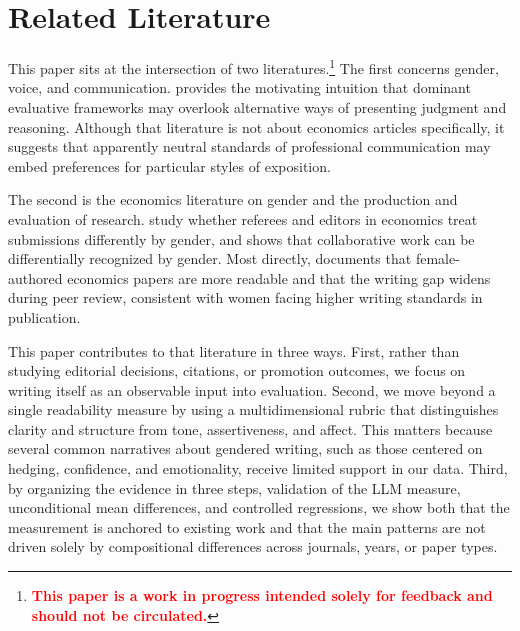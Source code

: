 \section{Related Literature}\label{sec:lit}

This paper sits at the intersection of two literatures.\footnote{\textcolor{red}{\textbf{This paper is a work in progress intended solely for feedback and should not be circulated.}}} The first concerns gender, voice, and communication. \textcite{gilligan1993different} provides the motivating intuition that dominant evaluative frameworks may overlook alternative ways of presenting judgment and reasoning. Although that literature is not about economics articles specifically, it suggests that apparently neutral standards of professional communication may embed preferences for particular styles of exposition.

The second is the economics literature on gender and the production and evaluation of research. \textcite{card2020} study whether referees and editors in economics treat submissions differently by gender, and \textcite{sarsons2017recognition} shows that collaborative work can be differentially recognized by gender. Most directly, \textcite{hengel2022publishing} documents that female-authored economics papers are more readable and that the writing gap widens during peer review, consistent with women facing higher writing standards in publication.

This paper contributes to that literature in three ways. First, rather than studying editorial decisions, citations, or promotion outcomes, we focus on writing itself as an observable input into evaluation. Second, we move beyond a single readability measure by using a multidimensional rubric that distinguishes clarity and structure from tone, assertiveness, and affect. This matters because several common narratives about gendered writing, such as those centered on hedging, confidence, and emotionality, receive limited support in our data. Third, by organizing the evidence in three steps, validation of the LLM measure, unconditional mean differences, and controlled regressions, we show both that the measurement is anchored to existing work and that the main patterns are not driven solely by compositional differences across journals, years, or paper types.